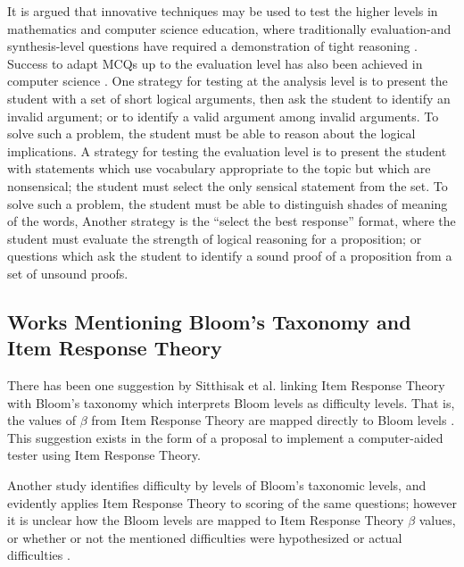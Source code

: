 It is argued that innovative techniques may be used to test the higher levels
in mathematics and computer science education, where traditionally
evaluation-and synthesis-level questions have required a demonstration of tight
reasoning \cite{sim2004implementation}.  Success to adapt MCQs up to the
evaluation level has also been achieved in computer science
\cite{castleberry2016effect}.  One strategy for testing at the analysis level
is to present the student with a set of short logical arguments, then ask the
student to identify an invalid argument; or to identify a valid argument among
invalid arguments.   To solve such a problem, the student must be able to
reason about the logical implications.  A strategy for testing the evaluation
level is to present the student with statements which use vocabulary
appropriate to the topic but which are nonsensical; the student must select the
only sensical statement from the set.  To solve such a problem, the student
must be able to distinguish shades of meaning of the words, Another strategy is
the ``select the best response'' format, where the student must evaluate the
strength of logical reasoning for a proposition; or questions which ask the
student to identify a sound proof of a proposition from a set of unsound
proofs.


\subsection{Works Mentioning Bloom's Taxonomy and Item Response Theory}

There has been one suggestion by Sitthisak et al.  linking Item Response Theory
with Bloom's taxonomy which interprets Bloom levels as difficulty levels.  That
is, the values of $\beta$ from Item Response Theory are mapped directly to
Bloom levels \cite{sitthisak}.  This suggestion exists in the form of a
proposal to implement a computer-aided tester using Item Response Theory.

Another study identifies difficulty by levels of Bloom's taxonomic levels, and
evidently applies Item Response Theory to scoring of the same questions;
however it is unclear how the Bloom levels are mapped to Item Response Theory
$\beta$ values, or whether or not the mentioned difficulties were hypothesized
or actual difficulties \cite{osborne2013grounded}.  

